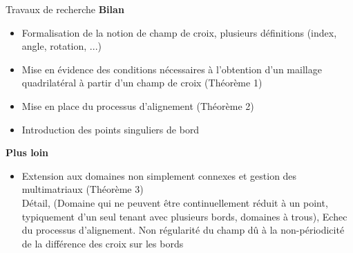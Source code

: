 \documentclass[compress,10pt,aspectratio=169]{beamer}
\begin{document}
\begin{frame}{Travaux de recherche}
\small
{\bf Bilan}\\\vspace{0.2cm}
\begin{itemize}
\item Formalisation de la notion de champ de croix, plusieurs définitions (index, angle, rotation, ...)\\\vspace{0.1cm}
\item Mise en évidence des conditions nécessaires à l'obtention d'un maillage quadrilatéral à partir d'un champ de croix (Théorème 1)\\\vspace{0.1cm}
\item Mise en place du processus d'alignement (Théorème 2)\\\vspace{0.1cm}
\item Introduction des points singuliers de bord\\\vspace{0.2cm}
\end{itemize}
{\bf Plus loin}\\\vspace{0.2cm}
\begin{itemize}
\item Extension aux domaines non simplement connexes et gestion des multimatriaux (Théorème 3)\\\vspace{0.1cm}
{\color{onera_gray}\small Détail, (Domaine qui ne peuvent être continuellement réduit à un point, typiquement d'un seul tenant avec plusieurs bords, domaines à trous)}, {\color{onera_gray} Echec du processus d'alignement. Non régularité du champ dû à la non-périodicité de la différence des croix sur les bords}
\end{itemize}
\end{frame}
\end{document}

